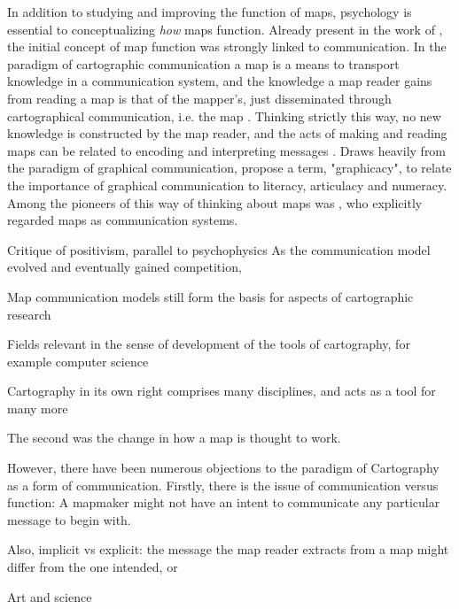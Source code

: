In addition to studying and improving the function of maps,
psychology is essential to conceptualizing \textit{how} maps function.
Already present in the work of \textcite{rob1952},
the initial concept of map function was strongly linked to communication.
In the paradigm of cartographic communication
a map is a means to transport knowledge in a communication system,
and the knowledge a map reader gains from reading a map is that of the mapper's,
just disseminated through cartographical communication, i.e. the map \parencite{ken2018}.
Thinking strictly this way,
no new knowledge is constructed by the map reader,
and the acts of making and reading maps can be related to
encoding and interpreting messages \parencite{mac2004}.
Draws heavily from the paradigm of graphical communication,  %
\textcite{bal1966} propose a term, "graphicacy",
to relate the importance of graphical communication to literacy, articulacy and numeracy.
Among the pioneers of this way of thinking about maps was \textcite{kol1969},
who explicitly regarded maps as communication systems.

Critique of positivism, parallel to psychophysics
As the communication model evolved and eventually gained competition,

Map communication models still form the basis for aspects of cartographic research \parencite{ken2018}  %

Fields relevant in the sense of development of the tools of cartography,
for example computer science \parencite{mon1985}

Cartography in its own right comprises many disciplines,
and acts as a tool for many more

\parencite{kai2020}


The second was the change in how a map is thought to work.

However, there have been numerous objections to the paradigm of Cartography as a form of communication.
Firstly, there is the issue of communication versus function:
A mapmaker might not have an intent to communicate any particular message to begin with.

Also, implicit vs explicit:
the message the map reader extracts from a map might differ from the one intended, or


Art and science \parencite{mac2004, tyn1992}  %


